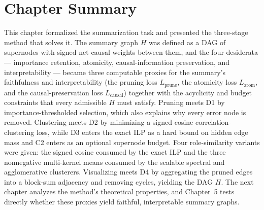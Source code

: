 \documentclass[../main.tex]{subfiles}
\begin{document}
\section{Chapter Summary}
This chapter formalized the summarization task and presented the three-stage method
that solves it. The summary graph $H$ was defined as a DAG of supernodes with
signed net causal weights between them, and the four desiderata --- importance
retention, atomicity, causal-information preservation, and interpretability ---
became three computable proxies for the summary's faithfulness and interpretability
(the pruning loss $L_{\text{prune}}$, the atomicity loss $L_{\text{atom}}$, and the
causal-preservation loss $L_{\text{causal}}$) together with the acyclicity and
budget constraints that every admissible $H$ must satisfy. Pruning meets D1 by importance-thresholded
selection, which also explains why every error node is removed. Clustering meets D2 by
minimizing a signed-cosine correlation-clustering loss, while D3 enters the exact ILP
as a hard bound on hidden edge mass and C2 enters as an optional supernode budget.
Four role-similarity variants were given: the signed cosine consumed by the exact ILP
and the three nonnegative multi-kernel means consumed by the scalable spectral and
agglomerative clusterers. Visualizing meets D4 by aggregating the pruned edges into a
block-sum adjacency and removing cycles, yielding the DAG $H$. The next chapter
analyzes the method's theoretical properties, and Chapter~5 tests directly whether
these proxies yield faithful, interpretable summary graphs.
\end{document}
